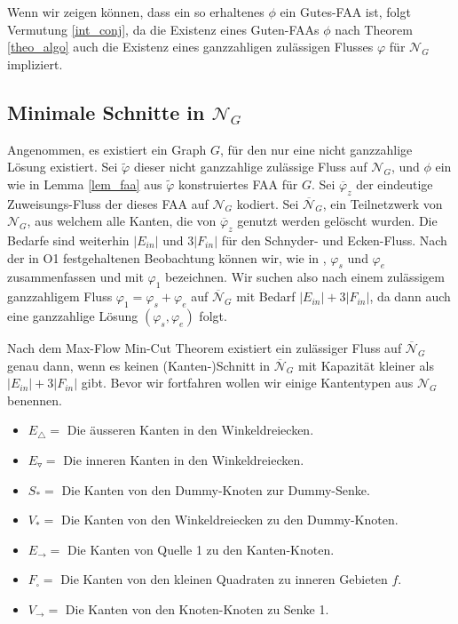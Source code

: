 Wenn wir zeigen können, dass ein so erhaltenes $\phi$ ein Gutes-FAA ist, folgt Vermutung \ref{int_conj}, da die Existenz eines Guten-FAAs $\phi$ nach Theorem \ref{theo_algo} auch die Existenz eines ganzzahligen zulässigen Flusses $\varphi$ für $\mathcal{N}_G$ impliziert.

\subsection{Minimale Schnitte in $\mathcal{N}_G$}

Angenommen, es existiert ein Graph $G$, für den nur eine nicht ganzzahlige Lösung existiert. Sei $\tilde{\varphi}$ dieser nicht ganzzahlige zulässige Fluss auf $\mathcal{N}_G$, und $\phi$ ein wie in Lemma \ref{lem_faa} aus $\tilde{\varphi}$ konstruiertes FAA für $G$. Sei $\overline{\varphi}_z$ der eindeutige Zuweisungs-Fluss der dieses FAA auf $\mathcal{N}_G$ kodiert. Sei $\overline{\mathcal{N}}_G$, ein Teilnetzwerk von $\mathcal{N}_G$, aus welchem alle Kanten, die von $\overline{\varphi}_z$ genutzt werden gelöscht wurden. Die Bedarfe sind weiterhin $|E_{in}|$ und $3|F_{in}|$ für den Schnyder- und Ecken-Fluss. Nach der in O1 festgehaltenen Beobachtung können wir, wie in \cite{af15}, $\varphi_s$ und $\varphi_e$ zusammenfassen und mit $\varphi_1$ bezeichnen. Wir suchen also nach einem zulässigem ganzzahligem Fluss $\varphi_1 = \varphi_s + \varphi_e$ auf $\overline{\mathcal{N}}_G$ mit Bedarf $|E_{in}| + 3|F_{in}|$, da dann auch eine ganzzahlige Lösung $(\varphi_s,\varphi_e)$ folgt.

Nach dem Max-Flow Min-Cut Theorem existiert ein zulässiger Fluss auf $\overline{\mathcal{N}}_G$ genau dann, wenn es keinen (Kanten-)Schnitt in $\overline{\mathcal{N}}_G$ mit Kapazität kleiner als $|E_{in}| + 3|F_{in}|$ gibt. Bevor wir fortfahren wollen wir einige Kantentypen aus $\mathcal{N}_G$ benennen.

\begin{itemize}
\item $E_\triangle = $ Die äusseren Kanten in den Winkeldreiecken.
\item $E_\triangledown = $ Die inneren Kanten in den Winkeldreiecken.
\item $S_* =$ Die Kanten von den Dummy-Knoten zur Dummy-Senke.
\item $V_* = $ Die Kanten von den Winkeldreiecken zu den Dummy-Knoten.
\item $E_{\to} = $ Die Kanten von Quelle 1 zu den Kanten-Knoten.
\item $F_\square = $ Die Kanten von den kleinen Quadraten zu inneren Gebieten $f$.
\item $V_{\to} = $ Die Kanten von den Knoten-Knoten zu Senke 1.
\end{itemize}

